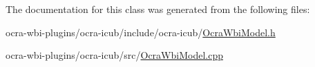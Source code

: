 \-The documentation for this class was generated from the following files\-:\begin{DoxyCompactItemize}
\item 
ocra-\/wbi-\/plugins/ocra-\/icub/include/ocra-\/icub/\hyperlink{OcraWbiModel_8h}{\-Ocra\-Wbi\-Model.\-h}\item 
ocra-\/wbi-\/plugins/ocra-\/icub/src/\hyperlink{OcraWbiModel_8cpp}{\-Ocra\-Wbi\-Model.\-cpp}\end{DoxyCompactItemize}
